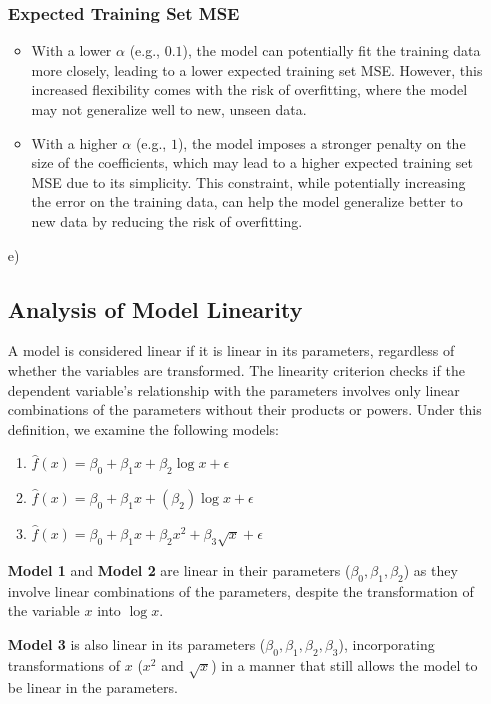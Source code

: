 \documentclass{article}
\begin{document}
\begin{itemize}
    \subsubsection*{Expected Training Set MSE}
    \begin{itemize}
        \item With a lower $\alpha$ (e.g., $0.1$), the model can potentially fit the training data more closely, leading to a lower expected training set MSE. However, this increased flexibility comes with the risk of overfitting, where the model may not generalize well to new, unseen data.
        \item With a higher $\alpha$ (e.g., $1$), the model imposes a stronger penalty on the size of the coefficients, which may lead to a higher expected training set MSE due to its simplicity. This constraint, while potentially increasing the error on the training data, can help the model generalize better to new data by reducing the risk of overfitting.
    \end{itemize}
    
    \item[e)]
        \subsection*{Analysis of Model Linearity}

A model is considered linear if it is linear in its parameters, regardless of whether the variables are transformed. The linearity criterion checks if the dependent variable's relationship with the parameters involves only linear combinations of the parameters without their products or powers. Under this definition, we examine the following models:

\begin{enumerate}
    \item $\hat{f} (x) = \beta_0+ \beta_1x + \beta_2\log x + \epsilon$
    \item $\hat{f} (x) = \beta_0 + \beta_1 x + (\beta_2)\log x + \epsilon$
    \item $\hat{f}(x) = \beta_0 + \beta_1x + \beta_2x^2 + \beta_3\sqrt{x} + \epsilon$
\end{enumerate}

\textbf{Model 1} and \textbf{Model 2} are linear in their parameters (\(\beta_0, \beta_1, \beta_2\)) as they involve linear combinations of the parameters, despite the transformation of the variable \(x\) into \(\log x\).

\textbf{Model 3} is also linear in its parameters (\(\beta_0, \beta_1, \beta_2, \beta_3\)), incorporating transformations of \(x\) (\(x^2\) and \(\sqrt{x}\)) in a manner that still allows the model to be linear in the parameters.


\end{itemize}
\end{document}

